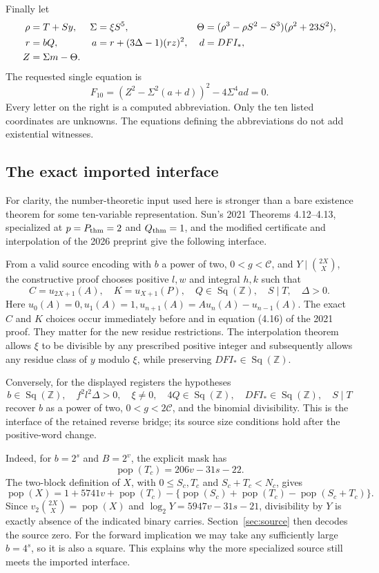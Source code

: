 \documentclass[11pt,a4paper]{article}
\theoremstyle{definition}\newtheorem{definition}[theorem]{Definition}
\theoremstyle{remark}\newtheorem{remark}[theorem]{Remark}
\newcommand{\Z}{\mathbb Z}\newcommand{\N}{\mathbb N}\newcommand{\Pos}{\mathbb Z_{>0}}
\newcommand{\Sq}{\operatorname{Sq}(\Z)}\newcommand{\Con}{\operatorname{Con}}
\newcommand{\pop}{\operatorname{pop}}\newcommand{\lc}{\operatorname{lc}}
\begin{document}
Finally let
\begin{align}
 \rho&=T+Sy,& \Sigma&=\xi S^5,&
 \Theta&=(\rho^3-\rho S^2-S^3)(\rho^2+23S^2),\notag\\
 r&=bQ,& a&=r+(3\Delta-1)(rz)^2,& d&=DFI_*,\notag\\
 Z&=\Sigma m-\Theta.&&&&\label{eq:ten-final-registers}
\end{align}
The requested single equation is
\begin{equation}\boxed{
 F_{10}=\left(Z^2-\Sigma^2(a+d)\right)^2-4\Sigma^4ad=0.
 }\label{eq:ten-final}
\end{equation}
Every letter on the right is a computed abbreviation. Only the ten listed
coordinates are unknowns. The equations defining the abbreviations do not
add existential witnesses.

\subsection{The exact imported interface}

For clarity, the number-theoretic input used here is stronger than a bare
existence theorem for some ten-variable representation. Sun's 2021
Theorems 4.12--4.13, specialized at $p=P_{\rm thm}=2$ and $Q_{\rm thm}=1$,
and the modified certificate and interpolation of the 2026 preprint give
the following interface.

From a valid source encoding with $b$ a power of two,
$0<g<\mathscr C$, and $Y\mid\binom{2X}{X}$, the constructive proof chooses
positive $l,w$ and integral $h,k$ such that
\[
 C=u_{2X+1}(A),\quad K=u_{X+1}(P),\quad
 Q\in\Sq,\quad S\mid T,\quad\Delta>0.
\]
Here $u_0(A)=0,u_1(A)=1,u_{n+1}(A)=Au_n(A)-u_{n-1}(A)$.
The exact $C$ and $K$ choices occur immediately before and in equation
(4.16) of the 2021 proof. They matter for the new residue restrictions.
The interpolation theorem allows $\xi$ to be divisible by any prescribed
positive integer and subsequently allows any residue class of $y$ modulo
$\xi$, while preserving $DFI_*\in\Sq$.

Conversely, for the displayed registers the hypotheses
\[
 b\in\Sq,\quad f^2l^2\Delta>0,\quad\xi\ne0,\quad
 4Q\in\Sq,\quad DFI_*\in\Sq,\quad S\mid T
\]
recover $b$ as a power of two, $0<g<2\mathscr C$, and the binomial
divisibility. This is the interface of the retained reverse bridge; its
source size conditions hold after the positive-word change.

Indeed, for $b=2^s$ and $B=2^v$, the explicit mask has
\[
 \pop(T_c)=206v-31s-22.
\]
The two-block definition of $X$, with $0\le S_c,T_c$ and $S_c+T_c<N_c$,
gives
\[
 \pop(X)=1+5741v+\pop(T_c)
 -\{\pop(S_c)+\pop(T_c)-\pop(S_c+T_c)\}.
\]
Since $v_2\binom{2X}{X}=\pop(X)$ and
$\log_2Y=5947v-31s-21$, divisibility by $Y$ is exactly absence of the
indicated binary carries. Section~\ref{sec:source} then decodes the source
zero. For the forward implication we may take any sufficiently large
$b=4^s$, so it is also a square. This explains why the more specialized
source still meets the imported interface.
\end{document}
